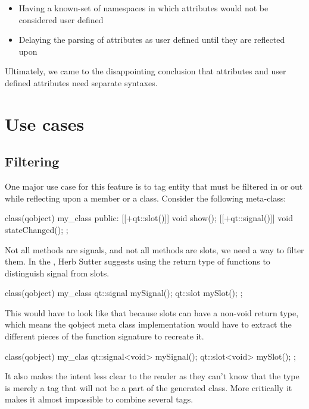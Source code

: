 \documentclass{wg21}
\begin{document}
\begin{itemize}
\item Having a known-set of namespaces in which attributes would not be considered user defined
\item Delaying the parsing of attributes as user defined until they are reflected upon
\end{itemize}

Ultimately, we came to the disappointing conclusion that attributes and user defined attributes need separate syntaxes. 

\section{Use cases}

\subsection{Filtering}

One major use case for this feature is to tag entity that must be filtered in or out while reflecting upon a member or a class.
Consider the following meta-class:

\begin{colorblock}
class(qobject) my_class {
public:
    [[+qt::slot()]] void show();
    [[+qt::signal()]] void stateChanged();
};

\end{colorblock}

Not all methods are signals, and not all methods are slots, we need a way to filter them.
In the \cite{P0707}, Herb Sutter suggests using the return type of functions to distinguish signal from slots.

\begin{colorblock}
class(qobject) my_class {
    qt::signal mySignal();
    qt::slot mySlot();
};
\end{colorblock}

This would have to look like that because slots can have a non-void return type, which means the qobject meta class implementation would have to extract the different pieces of the function signature to recreate it.

\begin{colorblock}
class(qobject) my_clas {
    qt::signal<void> mySignal();
    qt::slot<void> mySlot();
};
\end{colorblock}

It also makes the intent less clear to the reader as they can't know that the  type is merely a tag that will not be a part of the generated class.
More critically it makes it almost impossible to combine several tags.
\end{document}

